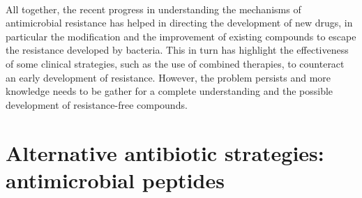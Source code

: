 \hspace{0.5cm}
\\
All together, the recent progress in understanding the mechanisms of antimicrobial resistance has helped in directing the development of new drugs, in particular the modification and the improvement of existing compounds to escape the resistance developed by bacteria. This in turn has highlight the effectiveness of some clinical strategies, such as the use of combined therapies, to counteract an early development of resistance. However, the problem persists and more knowledge needs to be gather for a complete understanding and the possible development of resistance-free compounds.


\section{Alternative antibiotic strategies: antimicrobial peptides}



